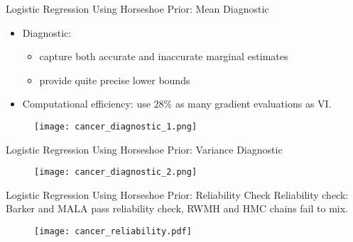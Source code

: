 \documentclass[10pt,xcolor=table]{beamer}
\begin{document}
\begin{frame}{Logistic Regression Using Horseshoe Prior: Mean Diagnostic}
\begin{itemize}
    \item Diagnostic:
    \begin{itemize}
    	\item capture both accurate and inaccurate marginal estimates
    	\item provide quite precise lower bounds
    \end{itemize}
    \item Computational efficiency: use $28\%$ as many gradient evaluations as VI.
\end{itemize}
     \begin{figure}
      \centering
      \texttt{[image: cancer\_diagnostic\_1.png]}
    \end{figure}
\end{frame}

\begin{frame}{Logistic Regression Using Horseshoe Prior: Variance Diagnostic}
	\begin{figure}
		\centering
		\texttt{[image: cancer\_diagnostic\_2.png]}
	\end{figure}
\end{frame}

\begin{frame}{Logistic Regression Using Horseshoe Prior: Reliability Check}
Reliability check: Barker and MALA pass reliability check, RWMH and HMC chains fail to mix. 
\begin{figure}
  \centering
  \texttt{[image: cancer\_reliability.pdf]}
\end{figure} 
\end{frame}
\end{document}
